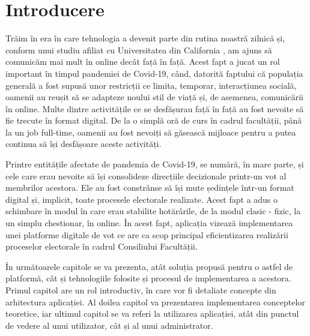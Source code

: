 \section*{Introducere}

Trăim în era în care tehnologia a devenit parte din rutina noastră zilnică și, conform unui studiu afiliat cu Universitatea din California \cite{online_vs_offline_communication}, am ajuns să comunicăm mai mult în online decât față în față. Acest fapt a jucat un rol important în timpul pandemiei de Covid-19, când, datorită faptului că populația generală a fost supusă unor restricții ce limita, temporar, interacțiunea socială, oamenii au reușit să se adapteze noului stil de viață și, de asemenea, comunicării în online. Multe dintre activitățile ce se desfășurau față în față au fost nevoite să fie trecute în format digital. De la o simplă oră de curs în cadrul facultății, până la un job full-time, oamenii au fost nevoiți să găsească mijloace pentru a putea continua să își desfășoare aceste activități.

Printre entitățile afectate de pandemia de Covid-19, se numără, în mare parte, și cele care erau nevoite să își consolideze direcțiile decizionale printr-un vot al membrilor acestora. Ele au fost constrânse să își mute ședințele într-un format digital și, implicit, toate procesele electorale realizate. Acest fapt a adus o schimbare în modul în care erau stabilite hotărârile, de la modul clasic - fizic, la un simplu chestionar, în online. În acest fapt, aplicația vizează implementarea unei platforme digitale de vot ce are ca scop principal eficientizarea realizării proceselor electorale în cadrul Consiliului Facultății.

În următoarele capitole se va prezenta, atât soluția propusă pentru o astfel de platformă, cât și tehnologiile folosite și procesul de implementarea a acestora. Primul capitol are un rol introductiv, în care vor fi detaliate concepte din arhitectura aplicației. Al doilea capitol va prezentarea implementarea conceptelor teoretice, iar ultimul capitol se va referi la utilizarea aplicației, atât din punctul de vedere al unui utilizator, cât și al unui administrator.
